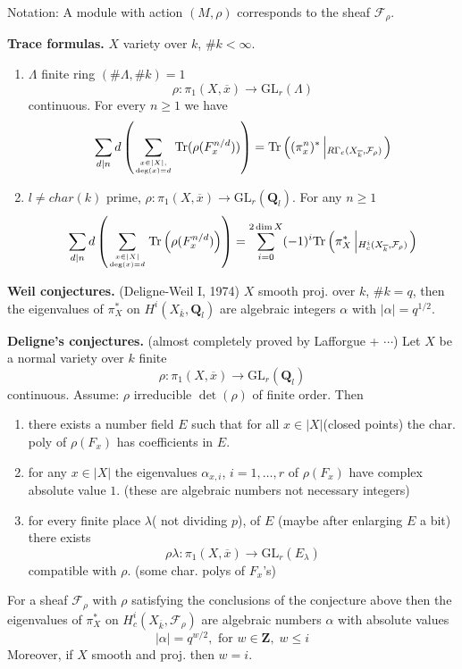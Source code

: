\noindent
Notation: A module with action $(M, \rho)$ corresponds to the sheaf
$\mathcal{F}_\rho$.

\medskip\noindent
{\bf Trace formulas.} $X$ variety over $k$, $\# k < \infty$.
\begin{enumerate}
\item $\Lambda$ finite ring $(\# \Lambda, \# k)=1$
$$
\rho: \pi_1(X, \overline x)\to \text{GL}_r(\Lambda)
$$
continuous. For every $n\geq 1$ we have
$$
\sum_{d|n}d\left(\sum_{x\in |X|,
\atop\deg(x)=d}\text{Tr}(\rho(F_x^{n/d}))\right) =
\text{Tr}\left((\pi_x^n)^*\left|_{R\Gamma_c(X_{\overline k},
\mathcal{F}_\rho)}\right.\right)
$$
\item $l\neq char(k)$ prime, $\rho: \pi_1(X, \overline x)\to
\text{GL}_r(\mathbf{Q}_l)$. For any $n\geq 1$
$$
\sum_{d|n} d\left(
\sum_{x\in |X|\atop \deg(x)=d}
\text{Tr}
\left(
\rho(F_x^{n/d})
\right)
\right) =
\sum_{i=0}^{2\dim X}
(-1)^i
\text{Tr}\left(
\pi_X^*\left|_{H_c^i(X_{\overline k}, \mathcal{F}_\rho)}\right.
\right)
$$
\end{enumerate}

\medskip\noindent
{\bf Weil conjectures.} (Deligne-Weil I, 1974) $X$ smooth proj. over $k$,
$\# k = q$, then the eigenvalues of $\pi_X^*$ on $H^i(X_{\overline k},
\mathbf{Q}_l)$ are algebraic integers $\alpha$ with $|\alpha|=q^{1/2}$.

\medskip\noindent
{\bf Deligne's conjectures.} (almost completely proved by
Lafforgue + $\cdots$) Let $X$ be a normal variety over $k$ finite
$$
\rho: \pi_1(X, \overline x) \longrightarrow \text{GL}_r(\mathbf{Q}_l)
$$
continuous. Assume: $\rho$ irreducible $\det(\rho)$ of finite order. Then
\begin{enumerate}
\item there exists a number field $E$ such that for all $x\in
|X|$(closed points) the char. poly of $\rho(F_x)$ has coefficients in $E$.
\item for any $x\in |X|$ the eigenvalues $\alpha_{x, i}$, $i=1, \ldots,
r$ of $\rho(F_x)$ have complex absolute value $1$.
(these are algebraic numbers not necessary integers)
\item for every finite place $\lambda$( not dividing $p$), of $E$
(maybe after enlarging $E$ a bit) there exists
$$
\rho\lambda: \pi_1(X, \overline x) \to \text{GL}_r(E_\lambda)
$$
compatible with $\rho$. (some char. polys of $F_x$'s)
\end{enumerate}

\begin{theorem}
\label{theorem-weil-II}
For a sheaf
$\mathcal{F}_\rho$ with $\rho$ satisfying the conclusions of the conjecture
above then the eigenvalues of $\pi_X^*$ on $H_c^i(X_{\overline k},
\mathcal{F}_{\rho})$ are algebraic numbers $\alpha$ with absolute values
$$
|\alpha|=q^{w/2}, \text{ for }w\in \mathbf{Z}, \; w\leq i
$$
Moreover, if $X$ smooth and proj. then $w=i$.
\end{theorem}


